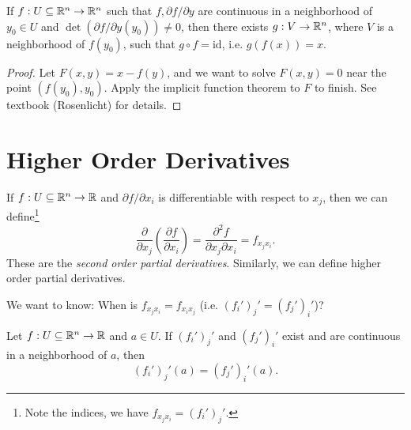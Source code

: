 \begin{corollary}
  If $f : U \subseteq \mathbb{R}^n \to \mathbb{R}^n$ such that
  $f, \partial f / \partial y$ are continuous in a
  neighborhood of $y_0 \in U$ and $\det(\partial f / \partial y(y_0)) \ne 0$,
  then there exists $g : V \to \mathbb{R}^n$, where $V$ is a
  neighborhood of $f(y_0)$, such that $g \circ f = \mathrm{id}$,
  i.e. $g(f(x)) = x$.
\end{corollary}

\begin{proof}
  Let $F(x, y) = x - f(y)$, and we want to solve
  $F(x, y) = 0$ near the point $(f(y_0), y_0)$. Apply the
  implicit function theorem to $F$ to finish. See
  textbook (Rosenlicht) for details.
\end{proof}

\section{Higher Order Derivatives}

\begin{definition}
  If $f : U \subseteq \mathbb{R}^n \to \mathbb{R}$ and $\partial f / \partial x_i$
  is differentiable with respect to $x_j$, then we can
  define\footnote{Note the indices, we have $f_{x_j x_i} = (f_i')_j'$.}
  \[
    \frac{\partial}{\partial x_j} \left(\frac{\partial f}{\partial x_i}\right)
    = \frac{\partial^2 f}{\partial x_j \partial x_i}
    = f_{x_j x_i}.
  \]
  These are the \emph{second order partial derivatives}.
  Similarly, we can define higher order partial
  derivatives.
\end{definition}

\begin{remark}
  We want to know: When is $f_{x_j x_i} = f_{x_i x_j}$
  (i.e. $(f_i')_j' = (f_j')_i'$)?
\end{remark}

\begin{theorem}
  Let $f : U \subseteq \mathbb{R}^n \to \mathbb{R}$ and $a \in U$.
  If $(f_i')_j'$ and $(f_j')_i'$ exist and are
  continuous in a neighborhood of $a$, then
  \[
    (f_i')_j'(a) = (f_j')_i'(a).
  \]
\end{theorem}


